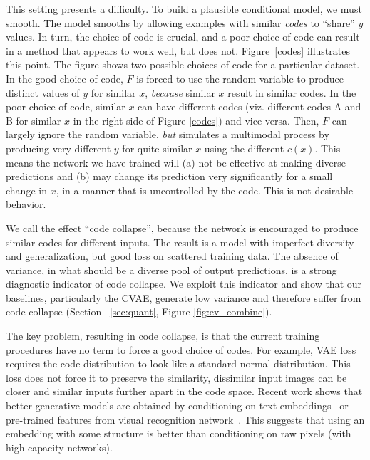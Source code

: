 \documentclass[10pt,twocolumn,letterpaper]{article}
\begin{document}
This setting presents a difficulty.  To build a plausible conditional model, we must smooth.
The model smooths by allowing examples with similar {\em codes} to ``share'' $y$ values.  In turn, the choice of code
is crucial, and a poor choice of code can result in a method that appears to work well, but does not.  
Figure~\ref{codes} illustrates this point.   The figure shows two possible choices of code for a particular dataset.  
In the good choice of code, $F$ is forced to use the random variable to produce distinct values of $y$ for similar $x$,
{\em because} similar $x$ result in similar codes.  
In the poor choice of code, similar $x$ can have different codes 
(viz. different codes A and B for similar $x$ in the right side of Figure \ref{codes}) and vice versa.  
Then, $F$ can largely ignore the random variable, {\em but} simulates a multimodal process 
by producing very different $y$ for quite similar $x$ using the different $c(x)$.
This means the network we have trained will (a) not be effective at making diverse predictions and (b) may change 
its prediction very significantly for a small change in $x$, in a manner that is uncontrolled by the code.  This is not 
desirable behavior.  

We call the effect ``code collapse'', because the network is
encouraged to produce similar codes for different inputs.  The result is a model with imperfect diversity 
and generalization, but good loss on scattered training data. The absence of variance, in what should be
a diverse pool of output predictions, is a strong diagnostic indicator of code collapse. We exploit 
this indicator and show that our baselines, particularly the CVAE, generate low variance and therefore 
suffer from code collapse (Section ~\ref{sec:quant}, Figure \ref{fig:ev_combine}).


The key problem, resulting in code collapse, is that the current training procedures have no term to force a good choice of 
codes. For example, VAE loss requires the code distribution to look like a standard normal 
distribution. This loss does not force it to preserve the similarity, dissimilar input 
images can be closer and similar inputs further apart in the code space. Recent work shows that better generative models 
are obtained by conditioning on text-embeddings~\cite{Scott16} or pre-trained features from visual 
recognition network~\cite{NguyenYBDC16}. This suggests that using an embedding with some structure
is better than conditioning on raw pixels (with high-capacity networks).  
\end{document}
